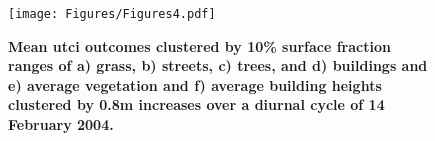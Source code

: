 \documentclass[final,3p,times,authoryear]{elsarticle}
\begin{document}
\begin{figure}
\centering
\texttt{[image: Figures/Figures4.pdf]}
\caption{\bf Mean \gls{utci} outcomes clustered by 10\% surface fraction ranges of a) grass, b) streets, c) trees, and d) buildings and e) average vegetation and f) average building heights clustered by 0.8m increases over a diurnal cycle of 14 February 2004. }
 \label{fig:utciday}
\end{figure}





%
%
%
%
%
\end{document}
